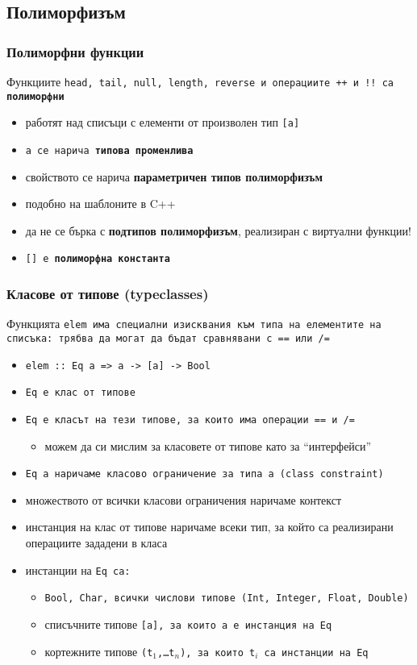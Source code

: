\documentclass{beamer}
\begin{document}
\subsection{Полиморфизъм}

\begin{frame}
  \frametitle{Полиморфни функции}
  Функциите \tt{head}, \tt{tail}, \tt{null}, \tt{length}, \tt{reverse} и операциите \tt{++} и \tt{!!} са \textbf{полиморфни}
  \begin{itemize}[<+->]
  \item работят над списъци с елементи от произволен тип \tt{[a]}
  \item \tt a се нарича \textbf{типова променлива}
  \item свойството се нарича \textbf{параметричен типов полиморфизъм}
  \item подобно на шаблоните в C++
  \item \alert{да не се бърка с \textbf{подтипов полиморфизъм}, реализиран с виртуални функции!}
  \item \tt{[]} е \textbf{полиморфна константа}
  \end{itemize}
\end{frame}

\begin{frame}
  \frametitle{Класове от типове (typeclasses)}
  Функцията \tt{elem} има специални изисквания към типа на елементите на списъка: трябва да могат да бъдат сравнявани с \tt{==} или \tt{/=}
  \begin{itemize}[<+->]
  \item \tt{elem :: \alert{Eq a => }a -> [a] -> Bool}
  \item \tt{Eq} е \alert{клас от типове}
  \item \tt{Eq} е класът на тези типове, за които има операции \tt{==} и \tt{/=}
    \begin{itemize}
    \item можем да си мислим за класовете от типове като за ``интерфейси''
    \end{itemize}
  \item \tt{Eq a} наричаме \alert{класово ограничение} за типа \tt a (class constraint)
  \item множеството от всички класови ограничения наричаме \alert{контекст}
  \item \alert{инстанция} на клас от типове наричаме всеки тип, за който са реализирани операциите зададени в класа
  \item инстанции на \tt{Eq} са:
    \begin{itemize}
    \item \tt{Bool}, \tt{Char}, всички числови типове (\tt{Int}, \tt{Integer}, \tt{Float}, \tt{Double})
    \item списъчните типове \tt{[a]}, за които \tt a е инстанция на \tt{Eq}
    \item кортежните типове \tt{(t$_1$,\ldots t$_n$)}, за които \tt{t$_i$} са инстанции на \tt{Eq}
    \end{itemize}
  \end{itemize}
\end{frame}
\end{document}
